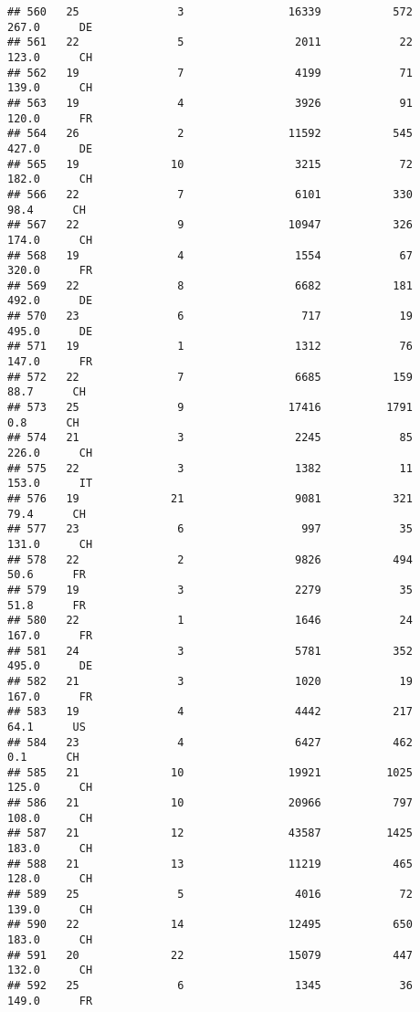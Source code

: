 \documentclass[
]{article}
\begin{document}
\begin{verbatim}
## 560   25               3                16339           572    267.0      DE
## 561   22               5                 2011            22    123.0      CH
## 562   19               7                 4199            71    139.0      CH
## 563   19               4                 3926            91    120.0      FR
## 564   26               2                11592           545    427.0      DE
## 565   19              10                 3215            72    182.0      CH
## 566   22               7                 6101           330     98.4      CH
## 567   22               9                10947           326    174.0      CH
## 568   19               4                 1554            67    320.0      FR
## 569   22               8                 6682           181    492.0      DE
## 570   23               6                  717            19    495.0      DE
## 571   19               1                 1312            76    147.0      FR
## 572   22               7                 6685           159     88.7      CH
## 573   25               9                17416          1791      0.8      CH
## 574   21               3                 2245            85    226.0      CH
## 575   22               3                 1382            11    153.0      IT
## 576   19              21                 9081           321     79.4      CH
## 577   23               6                  997            35    131.0      CH
## 578   22               2                 9826           494     50.6      FR
## 579   19               3                 2279            35     51.8      FR
## 580   22               1                 1646            24    167.0      FR
## 581   24               3                 5781           352    495.0      DE
## 582   21               3                 1020            19    167.0      FR
## 583   19               4                 4442           217     64.1      US
## 584   23               4                 6427           462      0.1      CH
## 585   21              10                19921          1025    125.0      CH
## 586   21              10                20966           797    108.0      CH
## 587   21              12                43587          1425    183.0      CH
## 588   21              13                11219           465    128.0      CH
## 589   25               5                 4016            72    139.0      CH
## 590   22              14                12495           650    183.0      CH
## 591   20              22                15079           447    132.0      CH
## 592   25               6                 1345            36    149.0      FR

\end{verbatim}
\end{document}
